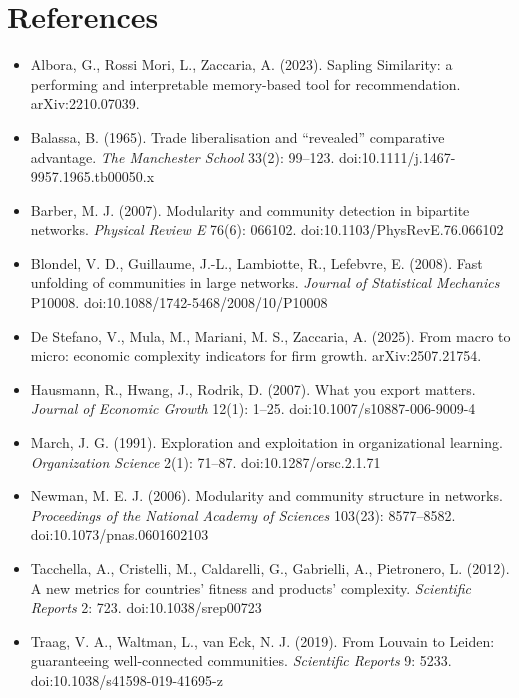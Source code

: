\documentclass[11pt]{article}
\begin{document}
\section*{References}
\footnotesize
\begin{itemize}[leftmargin=1.4em,labelsep=0.4em]\raggedright
  \item Albora, G., Rossi Mori, L., Zaccaria, A. (2023). Sapling Similarity: a performing and interpretable memory-based tool for recommendation. arXiv:2210.07039.
  \item Balassa, B. (1965). Trade liberalisation and ``revealed'' comparative advantage. \emph{The Manchester School} 33(2): 99--123. doi:10.1111/j.1467-9957.1965.tb00050.x
  \item Barber, M. J. (2007). Modularity and community detection in bipartite networks. \emph{Physical Review E} 76(6): 066102. doi:10.1103/PhysRevE.76.066102
  \item Blondel, V. D., Guillaume, J.-L., Lambiotte, R., Lefebvre, E. (2008). Fast unfolding of communities in large networks. \emph{Journal of Statistical Mechanics} P10008. doi:10.1088/1742-5468/2008/10/P10008
  \item De Stefano, V., Mula, M., Mariani, M. S., Zaccaria, A. (2025). From macro to micro: economic complexity indicators for firm growth. arXiv:2507.21754.
  \item Hausmann, R., Hwang, J., Rodrik, D. (2007). What you export matters. \emph{Journal of Economic Growth} 12(1): 1--25. doi:10.1007/s10887-006-9009-4
  \item March, J. G. (1991). Exploration and exploitation in organizational learning. \emph{Organization Science} 2(1): 71--87. doi:10.1287/orsc.2.1.71
  \item Newman, M. E. J. (2006). Modularity and community structure in networks. \emph{Proceedings of the National Academy of Sciences} 103(23): 8577--8582. doi:10.1073/pnas.0601602103
  \item Tacchella, A., Cristelli, M., Caldarelli, G., Gabrielli, A., Pietronero, L. (2012). A new metrics for countries' fitness and products' complexity. \emph{Scientific Reports} 2: 723. doi:10.1038/srep00723
  \item Traag, V. A., Waltman, L., van Eck, N. J. (2019). From Louvain to Leiden: guaranteeing well-connected communities. \emph{Scientific Reports} 9: 5233. doi:10.1038/s41598-019-41695-z
\end{itemize}
\end{document}
